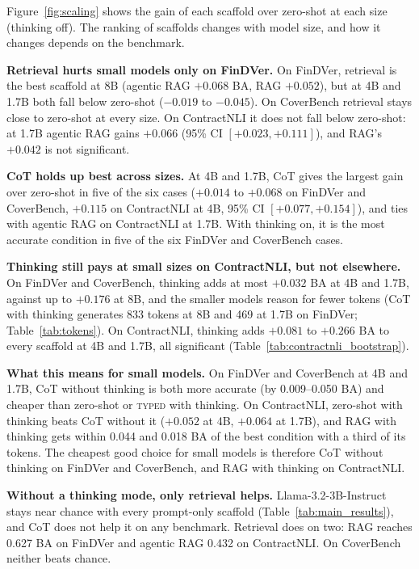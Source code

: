 \documentclass[11pt]{article}
\newcommand{\typed}{\textsc{typed}}
\begin{document}
Figure~\ref{fig:scaling} shows the gain of each scaffold over zero-shot at
each size (thinking off). The ranking of scaffolds changes with model
size, and how it changes depends on the benchmark.

\noindent \textbf{Retrieval hurts small models only on FinDVer.} On
FinDVer, retrieval is the best scaffold at 8B (agentic RAG $+0.068$ BA,
RAG $+0.052$), but at 4B and 1.7B both fall below zero-shot ($-0.019$ to
$-0.045$). On CoverBench retrieval stays close to zero-shot at every size.
On ContractNLI it does not fall below zero-shot: at 1.7B agentic RAG gains
$+0.066$ (95\% CI $[+0.023,+0.111]$), and RAG's $+0.042$ is not
significant.

\noindent \textbf{CoT holds up best across sizes.} At 4B and 1.7B, CoT
gives the largest gain over zero-shot in five of the six cases ($+0.014$
to $+0.068$ on FinDVer and CoverBench, $+0.115$ on ContractNLI at 4B, 95\%
CI $[+0.077,+0.154]$), and ties with agentic RAG on ContractNLI at 1.7B.
With thinking on, it is the most accurate condition in five of the six
FinDVer and CoverBench cases.

\noindent \textbf{Thinking still pays at small sizes on ContractNLI, but not
elsewhere.} On FinDVer and CoverBench, thinking adds at most $+0.032$ BA at
4B and 1.7B, against up to $+0.176$ at 8B, and the smaller models reason
for fewer tokens (CoT with thinking generates 833 tokens at 8B and 469 at
1.7B on FinDVer; Table~\ref{tab:tokens}). On ContractNLI, thinking adds
$+0.081$ to $+0.266$ BA to every scaffold at 4B and 1.7B, all significant
(Table~\ref{tab:contractnli_bootstrap}).

\noindent \textbf{What this means for small models.} On FinDVer and
CoverBench at 4B and 1.7B, CoT without thinking is both more accurate (by
0.009--0.050 BA) and cheaper than zero-shot or \typed{} with thinking. On
ContractNLI, zero-shot with thinking beats CoT without it ($+0.052$ at 4B,
$+0.064$ at 1.7B), and RAG with thinking gets within 0.044 and 0.018 BA of
the best condition with a third of its tokens. The cheapest good choice
for small models is therefore CoT without thinking on FinDVer and
CoverBench, and RAG with thinking on ContractNLI.

\noindent \textbf{Without a thinking mode, only retrieval helps.}
Llama-3.2-3B-Instruct stays near chance with every prompt-only scaffold
(Table~\ref{tab:main_results}), and CoT does not help it on any benchmark.
Retrieval does on two: RAG reaches 0.627 BA on FinDVer and agentic RAG
0.432 on ContractNLI. On CoverBench neither beats chance.
\end{document}
